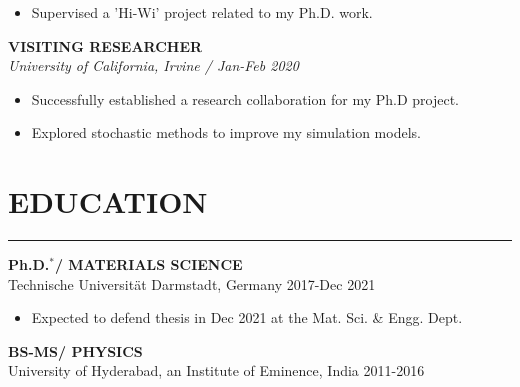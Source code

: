 {\begin{minipage}[t][\textheight-2\fboxsep-2\fboxrule][t]{.6\textwidth}
\begin{itemize}[noitemsep,topsep=0pt]
\item Supervised a 'Hi-Wi' project related to my Ph.D. work.
\end{itemize} \vspace{0.23cm}

\textbf{\uppercase {Visiting Researcher}} \\
\textit{University of California, Irvine / Jan-Feb 2020}
\begin{itemize}[noitemsep,topsep=0pt]
\item Successfully established a research collaboration for my Ph.D project. 
\item Explored stochastic methods to improve my simulation models. %
\end{itemize} \vspace{0.23cm}

\section*{EDUCATION} \vskip -3.5mm {\color{cyan}\hrule} \vskip 3.5mm
\textbf{Ph.D.$^{*}$/ MATERIALS SCIENCE} \\
Technische Universit\"at Darmstadt, Germany \hfill 2017-Dec 2021 
\begin{itemize}[noitemsep,topsep=0pt]
	\item Expected to defend thesis in Dec 2021 at the Mat. Sci. \& Engg. Dept.
\end{itemize} \vspace{0.23cm}

\textbf{BS-MS/ PHYSICS} \\
University of Hyderabad, an Institute of Eminence, India \hfill 2011-2016




\end{minipage}}
